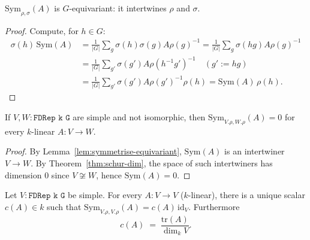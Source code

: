 \begin{lemma}
  \label{lem:symmetrise-equivariant}
  $\mathrm{Sym}_{\rho,\sigma}(A)$ is $G$-equivariant: it intertwines $\rho$ and
  $\sigma$.
\end{lemma}

\begin{proof}
  Compute, for $h \in G$:
  \begin{align*}
    \sigma(h)\,\mathrm{Sym}(A) &= \tfrac{1}{|G|}\textstyle\sum_g \sigma(h)\sigma(g) A \rho(g)^{-1}
       = \tfrac{1}{|G|}\textstyle\sum_g \sigma(hg) A \rho(g)^{-1} \\
    &= \tfrac{1}{|G|}\textstyle\sum_{g'} \sigma(g') A \rho(h^{-1}g')^{-1}
       \quad (g' := hg) \\
    &= \tfrac{1}{|G|}\textstyle\sum_{g'} \sigma(g') A \rho(g')^{-1}\rho(h)
       = \mathrm{Sym}(A)\,\rho(h).
  \end{align*}
\end{proof}

\begin{lemma}
  \label{lem:symmetrise-nonzero-implies-iso}
  If $V, W : \texttt{FDRep k G}$ are simple and not isomorphic, then
  $\mathrm{Sym}_{V.\rho, W.\rho}(A) = 0$ for every $k$-linear $A : V \to W$.
\end{lemma}

\begin{proof}
  By Lemma~\ref{lem:symmetrise-equivariant}, $\mathrm{Sym}(A)$ is an
  intertwiner $V \to W$. By Theorem~\ref{thm:schur-dim}, the space of such
  intertwiners has dimension $0$ since $V \not\cong W$, hence
  $\mathrm{Sym}(A) = 0$.
\end{proof}

\begin{lemma}
  \label{lem:symmetrise-self-scalar}
  Let $V : \texttt{FDRep k G}$ be simple. For every $A : V \to V$ ($k$-linear),
  there is a unique scalar $c(A) \in k$ such that
  $\mathrm{Sym}_{V.\rho,V.\rho}(A) = c(A)\,\mathrm{id}_V$.  Furthermore
  \[
    c(A) \;=\; \frac{\mathrm{tr}(A)}{\dim_k V}.
  \]
\end{lemma}

